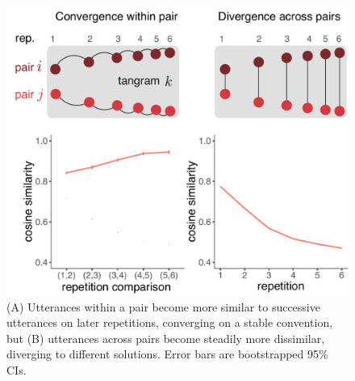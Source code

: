 \documentclass[alpha-refs]{wiley-article}
\begin{document}
\begin{figure}[t]
\centering
\includegraphics[scale=.5]{similarity_analysis.pdf}
\vspace{1em}
\caption{(A) Utterances within a pair become more similar to successive utterances on later repetitions, converging on a stable convention, but (B) utterances across pairs become steadily more dissimilar, diverging to different solutions. Error bars are bootstrapped 95\% CIs. }
\label{fig:similarity}
\end{figure}
\end{document}
